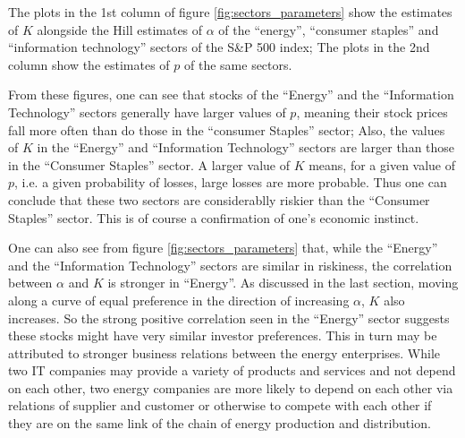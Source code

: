 \documentclass[11pt,a4]{amsart}
\newcommand{\1}{{\mathbf 1}}
\begin{document}
The plots in the 1st column of figure \ref{fig:sectors_parameters}
show the estimates of $K$ alongside the Hill estimates of $\alpha$ of
the ``energy'', ``consumer staples'' and ``information technology''
sectors of the S\&P 500 index;
The plots in the 2nd column show the estimates of $p$ of the same
sectors.

From these figures, one can see that stocks of the ``Energy'' and the
``Information Technology'' sectors generally have larger values of
$p$, meaning their stock prices fall more often than do those in the
``consumer Staples'' sector; Also, the values of $K$ in the ``Energy''
and ``Information Technology'' sectors are larger than those in the
``Consumer Staples'' sector. A larger value of $K$ means, for a given
value of $p$, i.e. a given probability of losses, large losses are
more probable. Thus one can conclude that these two sectors are
considerablly riskier than the ``Consumer Staples'' sector. This is of
course a confirmation of one's economic instinct.

One can also see from figure \ref{fig:sectors_parameters} that, while
the ``Energy'' and the ``Information Technology'' sectors are similar in
riskiness, the correlation between $\alpha$ and $K$ is stronger in
``Energy''. As discussed in the last section, moving along a curve of
equal preference in the direction of increasing $\alpha$, $K$ also
increases. So the strong positive correlation seen in the ``Energy''
sector suggests these stocks might have very similar investor
preferences. This in turn may be attributed to stronger business
relations between the energy enterprises. While two IT companies
may provide a variety of products and services and not depend on each
other, two energy companies are more likely to depend on each other
via relations of supplier and customer or otherwise to compete with each
other if they are on the same link of the chain of energy production
and distribution.
\end{document}
